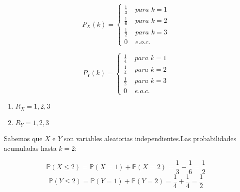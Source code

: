 \documentclass[10pt,a4paper]{book}
\begin{document}
\[
P_X(k)=
\begin{cases}
\frac{1}{3} & \textit{ para } k=1 \\
\frac{1}{6} & \textit{ para } k=2 \\
\frac{1}{2} & \textit{ para } k=3 \\
 0 & \textit{ e.o.c. } 
\end{cases}
\]

\[
P_Y(k)=
\begin{cases}
\frac{1}{4} & \textit{ para } k=1 \\
\frac{1}{4} & \textit{ para } k=2 \\
\frac{1}{2} & \textit{ para } k=3 \\
 0 & \textit{ e.o.c. } 
\end{cases}
\]


\begin{enumerate}
    \item \(R_{X}={1,2,3}\)
    \item \(R_{Y}={1,2,3}\)
\end{enumerate}


\vspace{0.2cm}

Sabemos que $X$ e $Y$ son variables aleatorias independientes.Las probabilidades acumuladas hasta $k=2$:

\[ \mathbb{P}(X \le 2) = \mathbb{P}(X=1) + \mathbb{P}(X=2) = \frac{1}{3} + \frac{1}{6} = \frac{1}{2} \]
\[ \mathbb{P}(Y \le 2) = \mathbb{P}(Y=1) + \mathbb{P}(Y=2) = \frac{1}{4} + \frac{1}{4} = \frac{1}{2} \]
\end{document}
